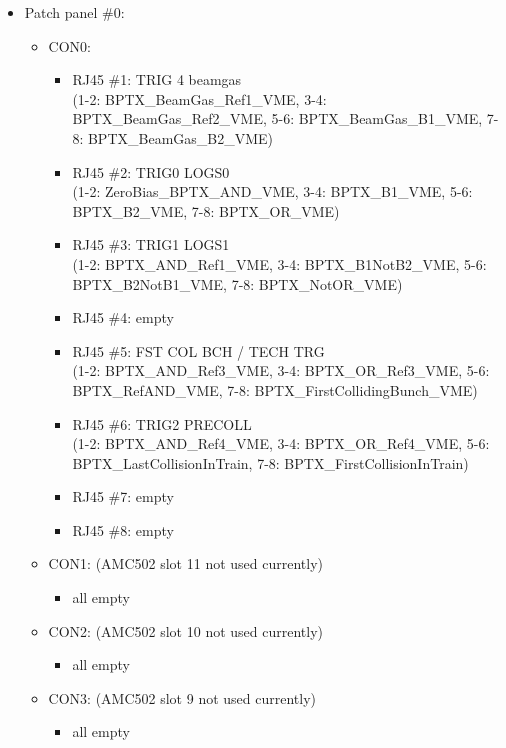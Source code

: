 \begin{itemize}
\item \small Patch panel \#0:
\begin{itemize}
\item \small CON0:
\begin{itemize}
    \item \small RJ45 \#1: TRIG 4 beamgas \\\tiny{(1-2: BPTX\_BeamGas\_Ref1\_VME, 3-4: BPTX\_BeamGas\_Ref2\_VME, 5-6: BPTX\_BeamGas\_B1\_VME, 7-8: BPTX\_BeamGas\_B2\_VME)}\normalsize
    \item \small RJ45 \#2: TRIG0 LOGS0 \\\tiny{(1-2: ZeroBias\_BPTX\_AND\_VME, 3-4: BPTX\_B1\_VME, 5-6: BPTX\_B2\_VME, 7-8: BPTX\_OR\_VME)}\normalsize
    \item \small RJ45 \#3: TRIG1 LOGS1 \\\tiny{(1-2: BPTX\_AND\_Ref1\_VME, 3-4: BPTX\_B1NotB2\_VME, 5-6: BPTX\_B2NotB1\_VME, 7-8: BPTX\_NotOR\_VME)}\normalsize
    \item \small RJ45 \#4: empty
    \item \small RJ45 \#5: FST COL BCH  / TECH TRG \\\tiny{(1-2: BPTX\_AND\_Ref3\_VME, 3-4: BPTX\_OR\_Ref3\_VME, 5-6: BPTX\_RefAND\_VME, 7-8: BPTX\_FirstCollidingBunch\_VME)}\normalsize
    \item \small RJ45 \#6: TRIG2 PRECOLL \\\tiny{(1-2: BPTX\_AND\_Ref4\_VME, 3-4: BPTX\_OR\_Ref4\_VME, 5-6: BPTX\_LastCollisionInTrain, 7-8: BPTX\_FirstCollisionInTrain)}\normalsize
    \item \small RJ45 \#7: empty
    \item \small RJ45 \#8: empty
\end{itemize}
\item \small CON1: (AMC502 slot 11 not used currently)
\begin{itemize}
    \item all empty
\end{itemize}
\item \small CON2: (AMC502 slot 10 not used currently)
\begin{itemize}
    \item all empty
\end{itemize}
\item \small CON3: (AMC502 slot 9 not used currently)
\begin{itemize}
    \item all empty
\end{itemize}

\end{itemize}
\end{itemize}
